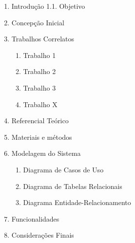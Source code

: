 \documentclass[
	article,			%
	12pt,				%
	oneside,			%
	a4paper,			%
    BIBLATEX,           %
	english,			%
	brazil,				%
	sumario=tradicional
	]{abntex2}
\begin{document}
\begin{enumerate}
\item Introdução
1.1. Objetivo
\item Concepção Inicial
\item Trabalhos Correlatos
    \begin{enumerate}
        \item Trabalho 1
        \item Trabalho 2
        \item Trabalho 3
        \item Trabalho X
    \end{enumerate}
\item Referencial Teórico
\item Materiais e métodos
\item Modelagem do Sistema
    \begin{enumerate}
        \item Diagrama de Casos de Uso
        \item Diagrama de Tabelas Relacionais
        \item Diagrama Entidade-Relacionamento
    \end{enumerate}
\item Funcionalidades
\item Considerações Finais
\end{enumerate}



\postextual


%
%



\end{document}
